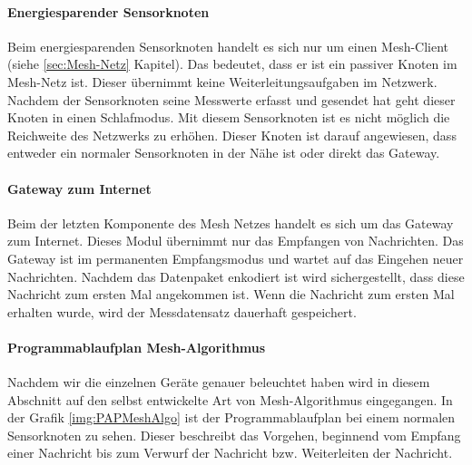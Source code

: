 \paragraph{Energiesparender Sensorknoten} Beim energiesparenden Sensorknoten handelt es sich nur um einen Mesh-Client (siehe \ref{sec:Mesh-Netz} Kapitel). Das bedeutet, dass er ist ein passiver Knoten im Mesh-Netz ist. Dieser übernimmt keine Weiterleitungsaufgaben im Netzwerk. Nachdem der Sensorknoten seine Messwerte erfasst und gesendet hat geht dieser Knoten in einen Schlafmodus. Mit diesem Sensorknoten ist es nicht möglich die Reichweite des Netzwerks zu erhöhen. Dieser Knoten ist darauf angewiesen, dass entweder ein normaler Sensorknoten in der Nähe ist oder direkt das Gateway.
\paragraph{Gateway zum Internet} Beim der letzten Komponente des Mesh Netzes handelt es sich um das Gateway zum Internet. Dieses Modul übernimmt nur das Empfangen von Nachrichten. Das Gateway ist im permanenten Empfangsmodus und wartet auf das Eingehen neuer Nachrichten. Nachdem das Datenpaket enkodiert ist wird sichergestellt, dass diese Nachricht zum ersten Mal angekommen ist. Wenn die Nachricht zum ersten Mal erhalten wurde, wird der Messdatensatz dauerhaft gespeichert. 
\paragraph{Programmablaufplan Mesh-Algorithmus} Nachdem wir die einzelnen Geräte genauer beleuchtet haben wird in diesem Abschnitt auf den  selbst entwickelte Art von Mesh-Algorithmus eingegangen. In der Grafik \ref{img:PAPMeshAlgo} ist der Programmablaufplan bei einem normalen Sensorknoten zu sehen. Dieser beschreibt das Vorgehen, beginnend vom Empfang einer Nachricht bis zum Verwurf der Nachricht bzw. Weiterleiten der Nachricht. 


